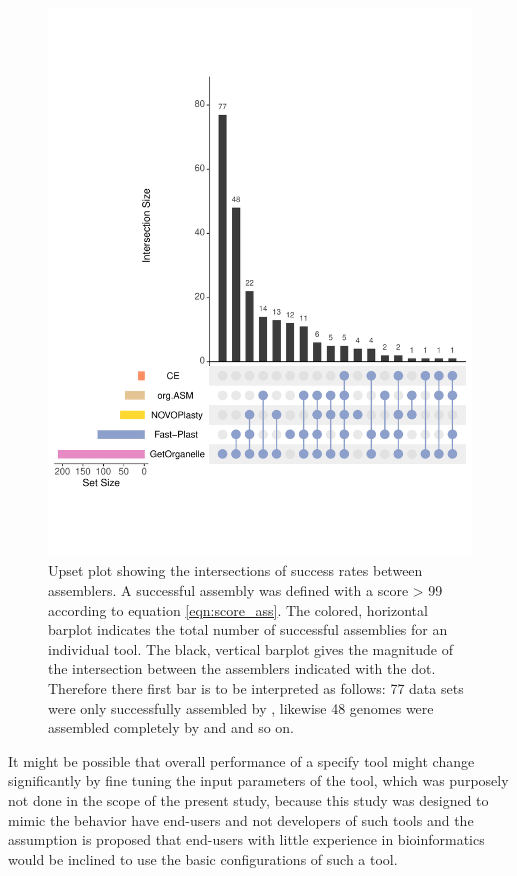 \begin{figure}[H]
\centering
\includegraphics[height=.65\textheight, width=.99\textwidth]{Figures/upset}
\decoRule
\caption[Upset plot comparing the success rates of of all assemblers]{Upset plot showing the intersections of
  success rates between assemblers. A successful assembly was defined with a score > 99 according to equation
  \ref{eqn:score_ass}. The colored, horizontal barplot indicates the total number of successful assemblies for
  an individual tool. The black, vertical barplot gives the magnitude of the intersection between the
  assemblers indicated with the dot. Therefore there first bar is to be interpreted as follows: 77 data sets
  were only successfully assembled by \ce, likewise 48 genomes were assembled completely by \go \hspace{0.5ex}
  and \fp \hspace{0.5ex} and so on. }
\label{fig:upset}
\end{figure}


It might be possible that overall performance of a specify tool might change significantly by fine tuning the
input parameters of the tool, which was purposely not done in the scope of the present study, because this
study was designed to mimic the behavior have end-users and not developers of such tools and the assumption is
proposed that end-users with little experience in bioinformatics would be inclined to use the basic
configurations of such a tool.


